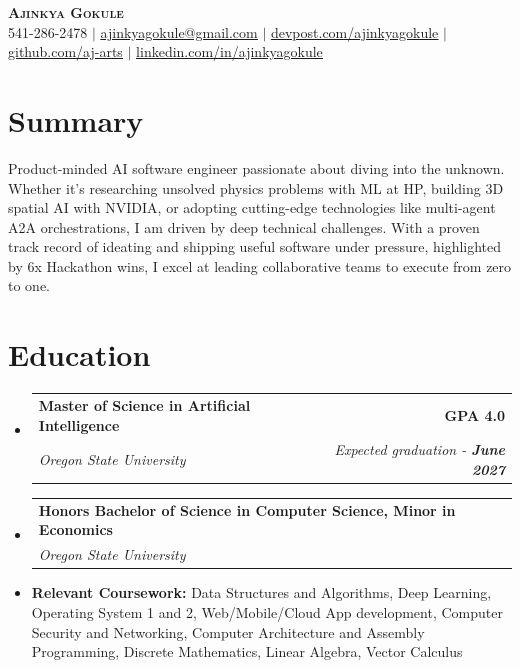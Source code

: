 \documentclass[letterpaper,11pt]{article}
\makeatletter
\newcommand{\resumeItem}[1]{
\item\small{
    {#1 \vspace{-2pt}}
  }
}
\newcommand{\resumeSubheading}[4]{
  \vspace{-2pt}
\item
  \begin{tabular*}{0.97\textwidth}[t]{l@{\extracolsep{\fill}}r}
    \textbf{#1} & #2 \\
    \textit{\small#3} & \textit{\small #4} \\
  \end{tabular*}\vspace{-7pt}
}
\newcommand{\resumeSubHeadingListStart}{
\begin{itemize}[leftmargin=0.15in, label={}]}
\newcommand{\resumeSubHeadingListEnd}{
\end{itemize}}
\makeatother
\begin{document}
\begin{center}
  \textbf{\Huge \scshape Ajinkya Gokule} \\ \vspace{1pt}
  \small 541-286-2478
  $|$
  \href{mailto:ajinkyagokule@gmail.com}{\underline{ajinkyagokule@gmail.com}}
  $|$
  \href{https://devpost.com/ajinkyagokule}{\underline{devpost.com/ajinkyagokule}}
  $|$
  \href{https://github.com/aj-arts}{\underline{github.com/aj-arts}}
  $|$
  \href{https://linkedin.com/in/ajinkyagokule}{\underline{linkedin.com/in/ajinkyagokule}}

\end{center}

\section{Summary}
\begin{itemize}[leftmargin=0.15in, label={}]
    \small{
    \item{
        Product-minded AI software engineer passionate about diving into the unknown. Whether it's researching unsolved physics problems with ML at HP, building 3D spatial AI with NVIDIA, or adopting cutting-edge technologies like multi-agent A2A orchestrations, I am driven by deep technical challenges. With a proven track record of ideating and shipping useful software under pressure, highlighted by 6x Hackathon wins, I excel at leading collaborative teams to execute from zero to one.
    }}
\end{itemize}


\section{Education}
\resumeSubHeadingListStart

\resumeSubheading
{Master of Science in Artificial Intelligence}{\textbf{GPA 4.0}}
{Oregon State University}{Expected graduation - \textbf{June 2027}}

\resumeSubheading
{Honors Bachelor of Science in Computer Science, Minor in Economics}{}
{Oregon State University}{}

\resumeItem{\textbf{Relevant Coursework: }Data Structures and Algorithms,
  Deep Learning, Operating System 1 and 2,
  Web/Mobile/Cloud App development,
  Computer Security and Networking,
  Computer Architecture and Assembly Programming,
  Discrete Mathematics,
  Linear Algebra,
  Vector Calculus
}
\resumeSubHeadingListEnd
\end{document}
